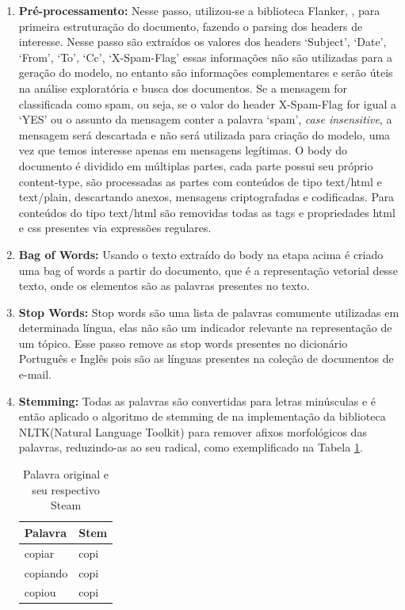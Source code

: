 \documentclass[12pt,a4paper]{article}
\begin{document}
\begin{enumerate}
\item \textbf{Pré-processamento:} Nesse passo, utilizou-se a biblioteca Flanker, , para primeira estruturação do documento, fazendo o parsing dos headers de interesse. Nesse passo são extraídos os valores dos headers ‘Subject’, ‘Date’, ‘From’, ‘To’, ‘Cc’, ‘X-Spam-Flag’ essas informações não são utilizadas para a geração do modelo,
 no entanto são informações complementares e serão úteis na análise exploratória e busca dos documentos. Se a mensagem for classificada como spam, ou seja, 
 se o valor do header X-Spam-Flag for igual a ‘YES’ ou o assunto da mensagem conter a palavra ‘spam’, \textit{case insensitive}, a mensagem será descartada e não será utilizada para criação do modelo,
 uma vez que temos interesse apenas em mensagens legítimas. O body do documento é dividido em múltiplas partes, cada parte possui seu próprio content-type,
 são processadas as partes com conteúdos de tipo text/html e text/plain, descartando anexos, mensagens criptografadas e codificadas. 
 Para conteúdos do tipo text/html são removidas todas as tags e propriedades html e css presentes via expressões regulares.
\item \textbf{Bag of Words:} Usando o texto extraído do body na etapa acima é criado uma bag of words a partir do documento, que é a representação vetorial desse texto,
 onde os elementos são as palavras presentes no texto.
\item \textbf{Stop Words:} Stop words são uma lista de palavras comumente utilizadas em determinada língua, elas não são um indicador relevante na representação de um tópico.
 Esse passo remove as stop words presentes no dicionário Português e Inglês pois são as línguas presentes na coleção de documentos de e-mail.
\item \textbf{Stemming:} Todas as palavras são convertidas para letras minúsculas e é então aplicado o algoritmo de stemming de 
 na implementação da biblioteca NLTK(Natural Language Toolkit)  para remover afixos morfológicos das palavras, reduzindo-as ao seu radical, como exemplificado na Tabela \ref{tab-stem}.


\begin{table}[H]
  \centering
  \begin{tabular}{l l}
  Palavra		&Stem \\
  \hline
  copiar		&copi \\
  copiando		&copi \\
  copiou		&copi \\
  \hline
  \end{tabular}
  \caption{Palavra original e seu respectivo Steam}
  \label{tab-stem}
\end{table}


\end{enumerate}
\end{document}
